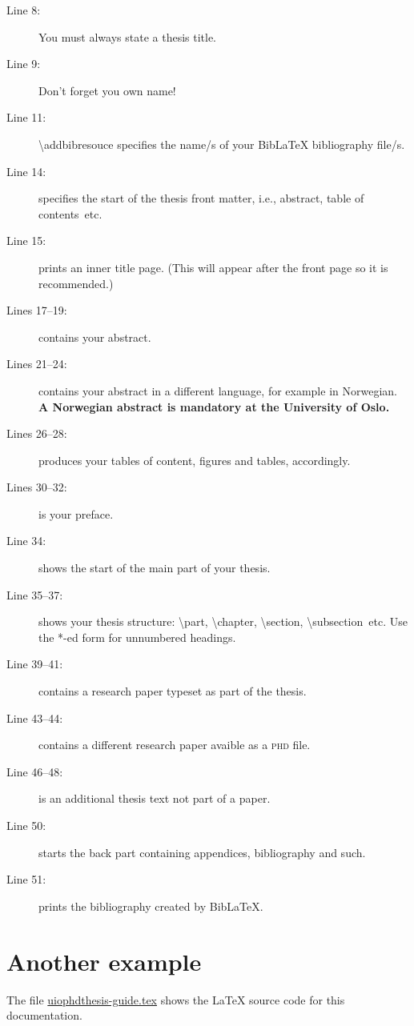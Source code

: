 \documentclass[UKenglish]{uiophdthesis}
\newcommand{\bsl}{\textbackslash}
\newcommand{\p}[1]{\textsf{#1}}
\newcommand{\pcmd}[1]{\p{\bsl #1}}
\begin{document}
\begin{description}
\item[Line 8:] You must always state a thesis title.
\item[Line 9:] Don't forget you own name!

\item [Line 11:] \pcmd{addbibresouce} specifies the name/s of your Bib\LaTeX{}
  bibliography file/s.

\item[Line 14:] specifies the start of the thesis front matter, i.e.,
  abstract, table of contents~etc.
\item[Line 15:] prints an inner title page. (This will appear after
  the front page so it is recommended.)
\item[Lines 17--19:] contains your abstract.
\item[Lines 21--24:] contains your abstract in a different language,
  for example in Norwegian. \textbf{A Norwegian abstract is mandatory
    at the University of Oslo.} 
\item[Lines 26--28:] produces your tables of content, figures and
  tables, accordingly.
\item[Lines 30--32:] is your preface.

\item[Line 34:] shows the start of the main part of your thesis.
\item[Line 35--37:] shows your thesis structure: \pcmd{part},
  \pcmd{chapter}, \pcmd{section}, \pcmd{subsection}~etc.
  Use the *-ed form for unnumbered headings.
\item[Line 39--41:] contains a research paper typeset as part of the thesis.
\item[Line 43--44:] contains a different research paper avaible as a
  \textsc{phd} file. 
\item[Line 46--48:] is an additional thesis text not part of a paper.
\item[Line 50:] starts the back part containing appendices,
  bibliography and such.
\item[Line 51:] prints the bibliography created by Bib\LaTeX.
\end{description}

\section{Another example}
The file \url{uiophdthesis-guide.tex} shows the \LaTeX{} source
code for this documentation.
\end{document}
